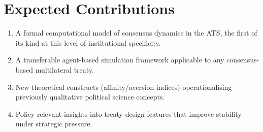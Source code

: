 \section{Expected Contributions}
\label{sec:contributions}

\begin{enumerate}
  \item A formal computational model of consensus dynamics in the ATS, the first of
        its kind at this level of institutional specificity.
  \item A transferable agent-based simulation framework applicable to any
        consensus-based multilateral treaty.
  \item New theoretical constructs (affinity/aversion indices) operationalising
        previously qualitative political science concepts.
  \item Policy-relevant insights into treaty design features that improve stability
        under strategic pressure.
\end{enumerate}
